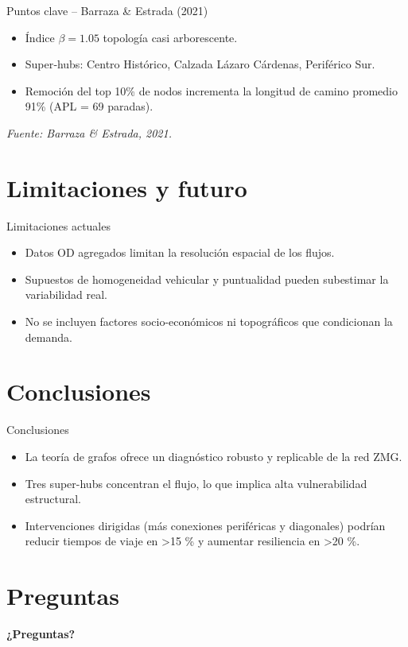 \documentclass[aspectratio=169,spanish]{beamer}
\begin{document}
\begin{frame}{Puntos clave – Barraza \& Estrada (2021)}
  \begin{itemize}
    \item Índice $\beta = 1.05$ \textrightarrow{} topología casi arborescente.
    \item Super‑hubs: Centro Histórico, Calzada Lázaro Cárdenas, Periférico Sur.
    \item Remoción del top 10\% de nodos incrementa la longitud de camino promedio 91\% (APL = 69 paradas).
  \end{itemize}
  \medskip
  {\small\itshape Fuente: Barraza \& Estrada, 2021.}
\end{frame}

\section{Limitaciones y futuro}

\begin{frame}{Limitaciones actuales}
  \begin{itemize}
    \item Datos OD agregados limitan la resolución espacial de los flujos.
    \item Supuestos de homogeneidad vehicular y puntualidad pueden subestimar la variabilidad real.
    \item No se incluyen factores socio-económicos ni topográficos que condicionan la demanda.
  \end{itemize}
\end{frame}

\section{Conclusiones}

\begin{frame}{Conclusiones}
  \begin{itemize}
    \item La teoría de grafos ofrece un diagnóstico robusto y replicable de la red ZMG.
    \item Tres super-hubs concentran el flujo, lo que implica alta vulnerabilidad estructural.
    \item Intervenciones dirigidas (más conexiones periféricas y diagonales) podrían reducir tiempos de viaje en >15 \% y aumentar resiliencia en >20 \%.
  \end{itemize}
\end{frame}

\section*{Preguntas}

\begin{frame}[plain]
  \centering
  \Huge\bfseries ¿Preguntas?
\end{frame}
\end{document}
